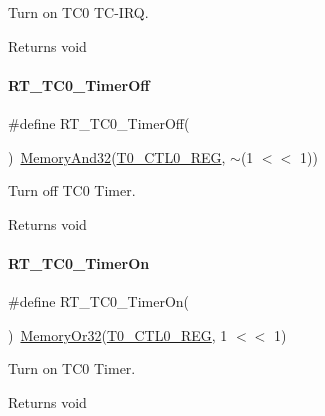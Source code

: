 Turn on T\+C0 T\+C-\/\+I\+RQ. 

\begin{DoxyReturn}{Returns}
void 
\end{DoxyReturn}
\mbox{\label{a00041_acbfad29faf802168f3281e5754e40aa9}} 
\paragraph{\texorpdfstring{R\+T\+\_\+\+T\+C0\+\_\+\+Timer\+Off}{RT\_TC0\_TimerOff}}
{\footnotesize\ttfamily \#define R\+T\+\_\+\+T\+C0\+\_\+\+Timer\+Off(\begin{DoxyParamCaption}{ }\end{DoxyParamCaption})~\mbox{\hyperlink{a00020_ad87cedffcaadc51db22594fce55173d4}{Memory\+And32}}(\mbox{\hyperlink{a00020_adadaa0ab1ebbd7ba9b70dfd24c3ed44da869abf9d87f78f45a0e07ad352abb39e}{T0\+\_\+\+C\+T\+L0\+\_\+\+R\+EG}}, $\sim$(1 $<$$<$ 1))}



Turn off T\+C0 Timer. 

\begin{DoxyReturn}{Returns}
void 
\end{DoxyReturn}
\mbox{\label{a00041_aa7936fffa8b7bcd47751d2e89f81d4a9}} 
\paragraph{\texorpdfstring{R\+T\+\_\+\+T\+C0\+\_\+\+Timer\+On}{RT\_TC0\_TimerOn}}
{\footnotesize\ttfamily \#define R\+T\+\_\+\+T\+C0\+\_\+\+Timer\+On(\begin{DoxyParamCaption}{ }\end{DoxyParamCaption})~\mbox{\hyperlink{a00020_a27874a97deab7cecdde5ddecf466e31e}{Memory\+Or32}}(\mbox{\hyperlink{a00020_adadaa0ab1ebbd7ba9b70dfd24c3ed44da869abf9d87f78f45a0e07ad352abb39e}{T0\+\_\+\+C\+T\+L0\+\_\+\+R\+EG}}, 1 $<$$<$ 1)}



Turn on T\+C0 Timer. 

\begin{DoxyReturn}{Returns}
void 
\end{DoxyReturn}
\mbox{\label{a00041_af8994aa8faed7529c93c25df30c020eb}} 
